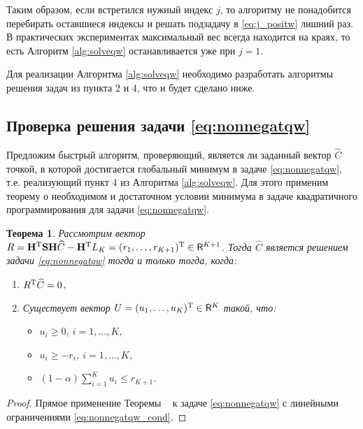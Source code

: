 \documentclass[10pt]{article}
\newtheorem{theorem}{Теорема}
\begin{document}
Таким образом, если встретился нужный индекс $j$, то алгоритму не понадобится перебирать оставшиеся индексы и решать подзадачу в \eqref{eq:j_positw} лишний раз. В практических экспериментах максимальный вес всегда находится на краях, то есть Алгоритм \ref{alg:solveqw} останавливается уже при $j = 1$.

Для реализации Алгоритма \ref{alg:solveqw} необходимо разработать алгоритмы решения задач из пункта 2 и 4, что и будет сделано ниже.

\subsection{Проверка решения задачи \eqref{eq:nonnegatqw}}
Предложим быстрый алгоритм, проверяющий, является ли заданный вектор $\widehat C$ точкой, в которой достигается глобальный минимум в задаче \eqref{eq:nonnegatqw}, т.е. реализующий пункт 4 из Алгоритма \ref{alg:solveqw}. Для этого применим теорему о необходимом и достаточном условии минимума в задаче квадратичного программирования для задачи \eqref{eq:nonnegatqw}.
\begin{theorem} \label{th:nonnegatfc}
	Рассмотрим вектор $R =  \mathbf{H}^{\mathrm{T}} \mathbf{S} \mathbf{H} \widehat C - \mathbf{H}^{\mathrm{T}} L_K = (r_1, \ldots, r_{K+1})^{\mathrm{T}} \in \mathsf{R}^{K+1}$. Тогда $\widehat C$ является решением задачи \eqref{eq:nonnegatqw} тогда и только тогда, когда:
	\begin{enumerate}
		\item $R^{\mathrm{T}} \widehat C = 0$,
		\item Существует вектор $U = (u_1, \ldots, u_K)^{\mathrm{T}} \in \mathsf{R}^K$ такой, что: \begin{itemize}
			\item $u_i \ge 0$, $i = 1, \ldots, K$,
			\item $u_i \ge -r_i$, $i = 1, \ldots, K$,
			\item $(1 - \alpha) \sum_{i=1}^K u_i \le r_{K+1}$.
		\end{itemize}
	\end{enumerate}
\end{theorem} 
\begin{proof}
	Прямое применение Теоремы  \cite[Теорема 9.2]{Gavurin1984} к задаче \eqref{eq:nonnegatqw} с линейными ограничениями \eqref{eq:nonnegatqw_cond}.
\end{proof}
\end{document}
